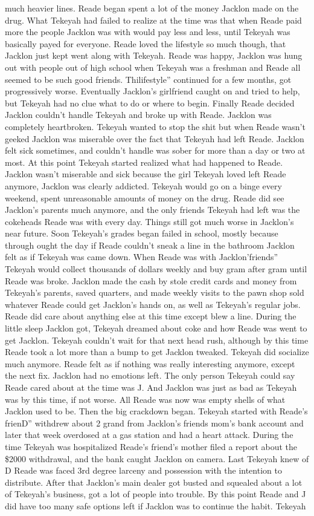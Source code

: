 \documentclass[12pt]{book}
\begin{document}
much heavier lines. Reade began spent a lot of the money Jacklon made on the drug. What Tekeyah had failed to realize at the time was that when Reade paid more the people Jacklon was with would pay less and less, until Tekeyah was basically payed for everyone. Reade loved the lifestyle so much though, that Jacklon just kept went along with Tekeyah. Reade was happy, Jacklon was hung out with people out of high school when Tekeyah was a freshman and Reade all seemed to be such good friends. Thilifestyle'' continued for a few months, got progressively worse. Eventually Jacklon's girlfriend caught on and tried to help, but Tekeyah had no clue what to do or where to begin. Finally Reade decided Jacklon couldn't handle Tekeyah and broke up with Reade. Jacklon was completely heartbroken. Tekeyah wanted to stop the shit but when Reade wasn't geeked Jacklon was miserable over the fact that Tekeyah had left Reade. Jacklon felt sick sometimes, and couldn't handle was sober for more than a day or two at most. At this point Tekeyah started realized what had happened to Reade. Jacklon wasn't miserable and sick because the girl Tekeyah loved left Reade anymore, Jacklon was clearly addicted. Tekeyah would go on a binge every weekend, spent unreasonable amounts of money on the drug. Reade did see Jacklon's parents much anymore, and the only friends Tekeyah had left was the cokeheads Reade was with every day. Things still got much worse in Jacklon's near future. Soon Tekeyah's grades began failed in school, mostly because through ought the day if Reade couldn't sneak a line in the bathroom Jacklon felt as if Tekeyah was came down. When Reade was with Jacklon'friends'' Tekeyah would collect thousands of dollars weekly and buy gram after gram until Reade was broke. Jacklon made the cash by stole credit cards and money from Tekeyah's parents, saved quarters, and made weekly visits to the pawn shop sold whatever Reade could get Jacklon's hands on, as well as Tekeyah's regular jobs. Reade did care about anything else at this time except blew a line. During the little sleep Jacklon got, Tekeyah dreamed about coke and how Reade was went to get Jacklon. Tekeyah couldn't wait for that next head rush, although by this time Reade took a lot more than a bump to get Jacklon tweaked. Tekeyah did socialize much anymore. Reade felt as if nothing was really interesting anymore, except the next fix. Jacklon had no emotions left. The only person Tekeyah could say Reade cared about at the time was J. And Jacklon was just as bad as Tekeyah was by this time, if not worse. All Reade was now was empty shells of what Jacklon used to be. Then the big crackdown began. Tekeyah started with Reade's frienD'' withdrew about 2 grand from Jacklon's friends mom's bank account and later that week overdosed at a gas station and had a heart attack. During the time Tekeyah was hospitalized Reade's friend's mother filed a report about the \$2000 withdrawal, and the bank caught Jacklon on camera. Last Tekeyah knew of D Reade was faced 3rd degree larceny and possession with the intention to distribute. After that Jacklon's main dealer got busted and squealed about a lot of Tekeyah's business, got a lot of people into trouble. By this point Reade and J did have too many safe options left if Jacklon was to continue the habit. Tekeyah 
\end{document}
